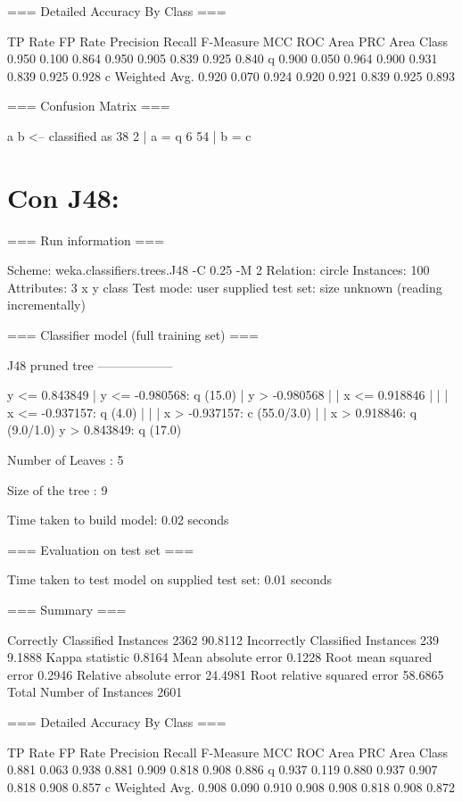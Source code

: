 \documentclass{report}
\begin{document}
	=== Detailed Accuracy By Class ===
	
	TP Rate  FP Rate  Precision  Recall   F-Measure  MCC      ROC Area  PRC Area  Class
	0.950    0.100    0.864      0.950    0.905      0.839    0.925     0.840     q
	0.900    0.050    0.964      0.900    0.931      0.839    0.925     0.928     c
	Weighted Avg.    0.920    0.070    0.924      0.920    0.921      0.839    0.925     0.893     
	
	=== Confusion Matrix ===
	
	a  b   <-- classified as
	38  2 |  a = q
	6 54 |  b = c
	
	
	\section{Con J48:}
	=== Run information ===
	
	Scheme:       weka.classifiers.trees.J48 -C 0.25 -M 2
	Relation:     circle
	Instances:    100
	Attributes:   3
	x
	y
	class
	Test mode:    user supplied test set:  size unknown (reading incrementally)
	
	=== Classifier model (full training set) ===
	
	J48 pruned tree
	------------------
	
	y <= 0.843849
	|   y <= -0.980568: q (15.0)
	|   y > -0.980568
	|   |   x <= 0.918846
	|   |   |   x <= -0.937157: q (4.0)
	|   |   |   x > -0.937157: c (55.0/3.0)
	|   |   x > 0.918846: q (9.0/1.0)
	y > 0.843849: q (17.0)
	
	Number of Leaves  : 	5
	
	Size of the tree : 	9
	
	
	Time taken to build model: 0.02 seconds
	
	=== Evaluation on test set ===
	
	Time taken to test model on supplied test set: 0.01 seconds
	
	=== Summary ===
	
	Correctly Classified Instances        2362               90.8112 %
	Incorrectly Classified Instances       239                9.1888 %
	Kappa statistic                          0.8164
	Mean absolute error                      0.1228
	Root mean squared error                  0.2946
	Relative absolute error                 24.4981 %
	Root relative squared error             58.6865 %
	Total Number of Instances             2601     
	
	=== Detailed Accuracy By Class ===
	
	TP Rate  FP Rate  Precision  Recall   F-Measure  MCC      ROC Area  PRC Area  Class
	0.881    0.063    0.938      0.881    0.909      0.818    0.908     0.886     q
	0.937    0.119    0.880      0.937    0.907      0.818    0.908     0.857     c
	Weighted Avg.    0.908    0.090    0.910      0.908    0.908      0.818    0.908     0.872     
	
\end{document}
